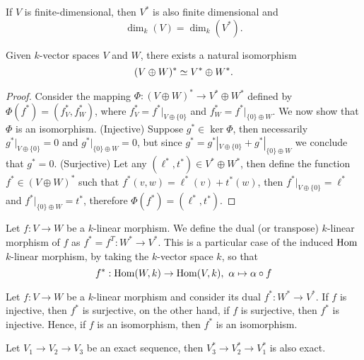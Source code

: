 \begin{proposition}
  If \(V\) is finite-dimensional, then \(V^\ast\) is also finite dimensional and
  \[
    \dim_k(V) = \dim_k (V^\ast).
  \]
\end{proposition}

\begin{proposition}
  Given \(k\)-vector spaces \(V\) and \(W\), there exists a natural isomorphism
  \[
    (V \oplus W)^\ast \simeq V^\ast \oplus W^\ast.
  \]
\end{proposition}

\begin{proof}
  Consider the mapping \(\Phi: (V \oplus W)^\ast \to V^\ast \oplus W^\ast\)
  defined by \(\Phi(f^\ast) = (f^\ast_V, f^\ast_W)\), where \(f^\ast_V =
  f^\ast|_{V \oplus \{0\}} \) and \(f^\ast_W = f^\ast|_{\{0\} \oplus W}\). We
  now show that \(\Phi\) is an isomorphism. (Injective) Suppose \(g^\ast \in
  \ker \Phi\), then necessarily \(g^\ast|_{V\oplus \{0\}} = 0\) and
  \(g^\ast|_{\{0\} \oplus W} = 0\), but since \(g^\ast = g^\ast|_{V\oplus
  \{0\}} + g^\ast|_{\{0\} \oplus W}\) we conclude that \(g^\ast = 0\).
  (Surjective) Let any \((\ell^\ast, t^\ast) \in V^\ast \oplus W^\ast\), then
  define the function \(f^\ast \in (V \oplus W)^\ast\) such that \(f^\ast(v, w)
  = \ell^\ast(v) + t^\ast(w)\), then \(f^\ast|_{V \oplus \{0\}} = \ell^\ast\)
  and \(f^\ast|_{\{0\} \oplus W} = t^\ast\), therefore \(\Phi(f^\ast) =
  (\ell^\ast, t^\ast)\).
\end{proof}

\begin{definition}
  Let \(f : V \to W\) be a \(k\)-linear morphism. We define the dual (or
  transpose) \(k\)-linear morphism of \(f\) as \(f^\ast = f^T : W^\ast \to
  V^\ast\). This is a particular case of the induced \(\operatorname{Hom}\) \(k\)-linear
  morphism, by taking the \(k\)-vector space \(k\), so that
  \[
    f^\ast : \operatorname{Hom}(W, k) \to \operatorname{Hom}(V, k),\ \alpha \mapsto \alpha \circ f
  \]
\end{definition}

\begin{proposition}
  Let \(f : V \to W\) be a \(k\)-linear morphism and consider its dual \(f^\ast
  : W^\ast \to V^\ast\). If \(f\) is injective, then \(f^\ast\) is surjective,
  on the other hand, if \(f\) is surjective, then \(f^\ast\) is injective.
  Hence, if \(f\) is an isomorphism, then \(f^*\) is an isomorphism.
\end{proposition}

\begin{proposition}
  Let \(V_1 \to V_2 \to V_3\) be an exact sequence, then \(V_3^\ast \to
  V_2^\ast \to V_1^\ast\) is also exact.
\end{proposition}

